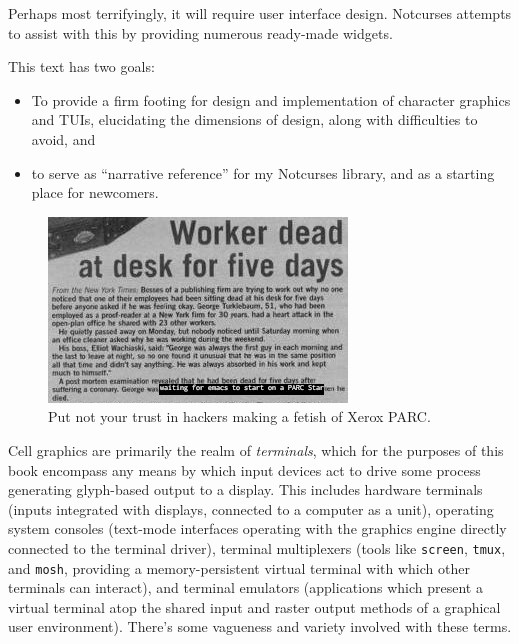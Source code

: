 \documentclass[letterpaper,10pt]{article}
\newenvironment{denseitemize}{
  \begin{itemize}
      \setlength{\itemsep}{0pt}
}{
  \end{itemize}
}
\begin{document}
Perhaps most terrifyingly, it will require user interface design. Notcurses
attempts to assist with this by providing numerous ready-made widgets.

This text has two goals:
\begin{denseitemize}
\item{To provide a firm footing for design and implementation of character
    graphics and TUIs, elucidating the dimensions of design, along with difficulties
    to avoid, and}
\item{to serve as ``narrative reference''\cite{newjournalism} for my Notcurses
      library, and as a starting place for newcomers.}
\end{denseitemize}

\begin{figure}[!htbp]
\centering \includegraphics[width=.5\linewidth]{media/emacs-xerox.jpg}
  \caption{Put not your trust in hackers making a fetish of Xerox PARC.}
  \label{fig:xeroxemacs}
\end{figure}

Cell graphics are primarily the realm of \textit{terminals}, which for the
purposes of this book encompass any means by which input devices act to drive
some process generating glyph-based output to a display. This includes hardware
terminals (inputs integrated with displays, connected to a computer as a unit),
operating system consoles (text-mode interfaces operating with the graphics
engine directly connected to the terminal driver), terminal multiplexers (tools
like \texttt{screen}, \texttt{tmux}, and \texttt{mosh}, providing a
memory-persistent virtual terminal with which other terminals can interact),
and terminal emulators (applications which present a virtual terminal atop the
shared input and raster output methods of a graphical user environment).
There's some vagueness and variety involved with these terms.
\end{document}

